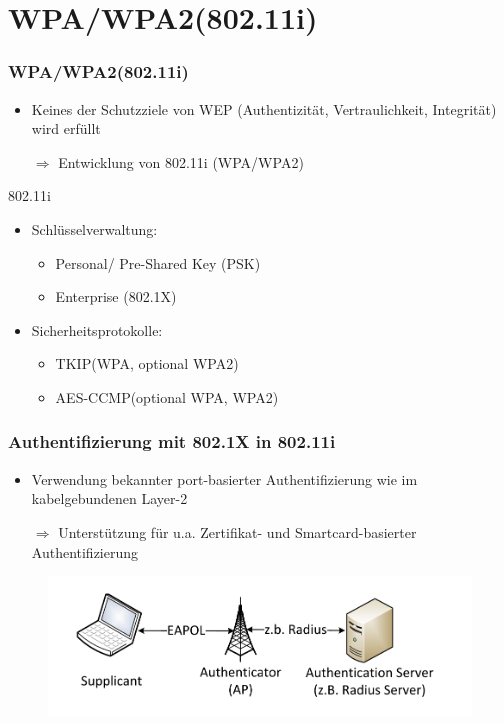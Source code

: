 \documentclass{beamer}
\begin{document}
\section{WPA/WPA2(802.11i)}
\begin{frame}
\frametitle{WPA/WPA2(802.11i)}
\begin{itemize}
	\item Keines der Schutzziele von WEP (Authentizität, Vertraulichkeit, Integrität) wird erfüllt
	\item[$\Rightarrow$] Entwicklung von 802.11i (WPA/WPA2)
\end{itemize}
\begin{block}{802.11i}
\begin{itemize}
	\item Schlüsselverwaltung:
	\begin{itemize}
		\item Personal/ Pre-Shared Key (PSK)
		\item Enterprise (802.1X)
	\end{itemize}
	\item Sicherheitsprotokolle:
	\begin{itemize}
		\item TKIP(WPA, optional WPA2)
		\item AES-CCMP(optional WPA, WPA2)
	\end{itemize}
\end{itemize}
\end{block}
\end{frame}

\begin{frame}
	\frametitle{Authentifizierung mit 802.1X in 802.11i}
	\begin{itemize}
		\item Verwendung bekannter port-basierter Authentifizierung wie im kabelgebundenen Layer-2
		\item[$\Rightarrow$] Unterstützung für u.a. Zertifikat- und Smartcard-basierter Authentifizierung
	\end{itemize}
	\begin{figure}
		\includegraphics[scale=0.7]{figures/ap_radius.pdf}

	\end{figure}
\end{frame}
\end{document}
